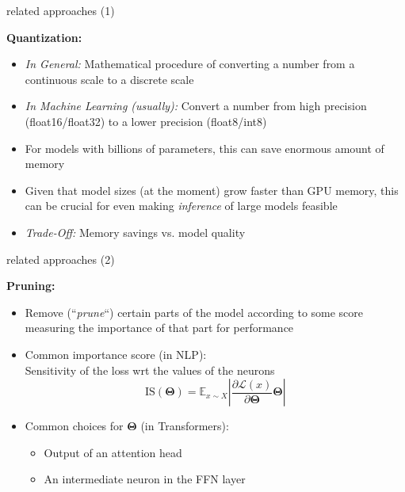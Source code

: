 \documentclass[11pt,compress,t,notes=noshow, xcolor=table]{beamer}
\begin{document}
\begin{frame}{related approaches (1)}

\vfill

\textbf{Quantization:}

\begin{itemize}
	\item \textit{In General:} Mathematical procedure of converting a number from a continuous scale to a discrete scale
	\item \textit{In Machine Learning (usually):} Convert a number from high precision (float16/float32) to a lower precision (float8/int8) 
	\item For models with billions of parameters, this can save enormous amount of memory
	\item Given that model sizes (at the moment) grow faster than GPU memory, this can be crucial for even making \textit{inference} of large models feasible
	\item \textit{Trade-Off:} Memory savings vs. model quality
\end{itemize}

\vfill
	
\end{frame}


\begin{frame}{related approaches (2)}

\vfill

\textbf{Pruning:}

\begin{itemize}
	\item Remove (``\textit{prune}``) certain parts of the model according to some score measuring the importance of that part for performance 
	\item Common importance score (in NLP):\\Sensitivity of the loss wrt the values of the neurons 
							$$\mathrm{IS}(\bm\Theta) = \mathbb{E}_{x\sim X}\left\lvert \frac{\partial \mathcal{L}(x)}{\partial\bm\Theta}\bm\Theta \right\rvert$$
	\item Common choices for $\bm\Theta$ (in Transformers):
			\begin{itemize}
				\item Output of an attention head
				\item An intermediate neuron in the FFN layer
			\end{itemize}
\end{itemize}

\vfill
	
\end{frame}
\end{document}
